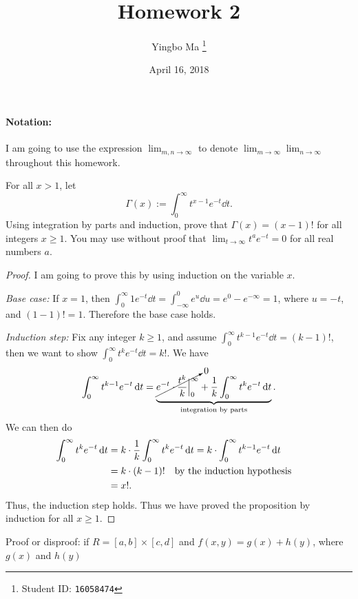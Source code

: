 \documentclass[8pt,twocolumn]{article}
\author{Yingbo Ma \thanks{Student ID: \tt{16058474}}}
\title{\vspace{-1.5cm}Homework 2}
\date{April 16, 2018}
\begin{document}
\maketitle

\paragraph{Notation:}
I am going to use the expression $\lim_{m,n\to\infty}$ to denote
$\lim_{m\to\infty}\lim_{n\to\infty}$ throughout this homework.

\begin{exercise}{10}
  For all $x>1$, let
  \[
    \Gamma(x) := \int_0^\infty t^{x-1}e^{-t}\dd{t}.
  \]
  Using integration by parts and induction, prove that $\Gamma(x)=(x-1)!$ for
  all integers $x\ge1$. You may use without proof that
  $\lim_{t\to\infty}t^ae^{-t}=0$ for all real numbers $a$.
\end{exercise}

\begin{proof}
  I am going to prove this by using induction on the variable $x$.

  \emph{Base case:} If $x=1$, then
  $\int_0^\infty1e^{-t}\dd{t}=\int_{-\infty}^0e^u\dd{u} = e^0-e^{-\infty} = 1$,
  where $u=-t$, and $(1-1)!=1$. Therefore the base case holds.

  \emph{Induction step:} Fix any integer $k\ge 1$, and assume $\int_0^\infty
  t^{k-1}e^{-t}\dd{t}=(k-1)!$, then we want to show $\int_0^\infty
  t^{k}e^{-t}\dd{t}=k!$. We have
  \begin{align*}
    \int_0^\infty t^{k-1}e^{-t}\dd{t} =
    \underbrace{\cancelto{0}{e^{-t}\cdot\frac{t^k}{k}\Big\vert_0^\infty} +
    \frac{1}{k}\int_0^\infty t^ke^{-t} \dd{t}}_\text{integration by parts}.
  \end{align*}
  We can then do
  \begin{align*}
    \int_0^\infty t^{k}e^{-t}\dd{t} &= k\cdot\frac{1}{k}\int_0^\infty t^ke^{-t}
    \dd{t}=k\cdot \int_0^\infty t^{k-1}e^{-t}\dd{t}\\
    &=k\cdot (k-1)!\qq{by the induction hypothesis}\\
    &=x!.
  \end{align*}
  Thus, the induction step holds. Thus we have proved the proposition by
  induction for all $x\ge 1$.
\end{proof}

\begin{exercise}{11}
  Proof or disproof: if $R=[a,b]\times[c,d]$ and $f(x,y)=g(x)+h(y)$, where
  $g(x)$ and $h(y)$
\end{exercise}
\end{document}
